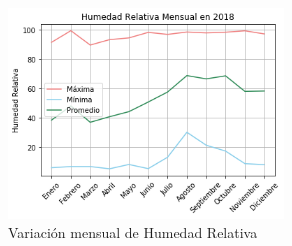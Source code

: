 \documentclass[11pt, spanish]{report}
\begin{document}
\begin{figure}[ht]
\caption{Variación mensual de Humedad Relativa}
\centering
\includegraphics[width=0.65\textwidth]{figura4.png}
\end{figure}
\end{document}
